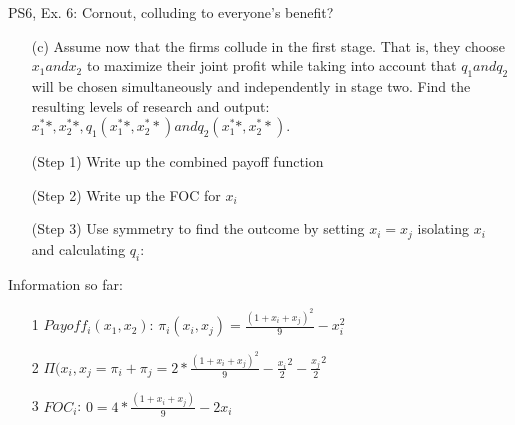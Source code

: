 \begin{frame}{PS6, Ex. 6: Cornout, colluding to everyone's benefit?}
    \begin{itemize}
    \item[(c)] Assume now that the firms collude in the first stage. That is, they choose $x_1 and x_2$ to maximize their joint profit while taking into account that $q_1 and q_2$ will be chosen simultaneously and independently in stage two. Find the resulting levels of research and output: $x_1^**,x_2^**,q_1(x_1^**,x_2^**) and q_2(x_1^**,x_2^**)$.
    \end{itemize}
    \vfill\null
  \begin{multicols}{2}
    \begin{itemize}
      \item[(Step 1)] Write up the combined payoff function
      \item[(Step 2)] Write up the FOC for $x_i$
      \item[(Step 3)] Use symmetry to find the outcome by setting $x_i=x_j$ isolating $x_i$ and calculating $q_i$:
      \end{itemize}
    \vfill\null \columnbreak
    Information so far:
    \begin{itemize}
    \item[1] $Payoff_i(x_1,x_2)$: $\pi_i(x_i,x_j) = \frac{(1+x_i+x_j)^2}{9}-x_i^2 $
    \item[2] $\Pi(x_i,x_j= \pi_i + \pi_j = 2*\frac{(1+x_i+x_j)^2}{9}-\frac{x_i}{2}^2-\frac{x_j}{2}^2 $
    \item[3] $FOC_i$: $0=4*\frac{(1+x_i+x_j)}{9}-2x_i$
    \end{itemize}
    \vfill\null
  \end{multicols}
\end{frame}

